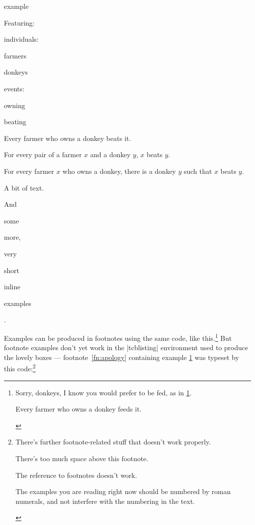 \documentclass[a4paper]{ltxdoc}
\begin{document}
\begin{tcblisting}{example}
  \begin{examples}
  \item Featuring:
    \begin{examples}
    \item individuals:
      \begin{examples*}
      \item farmers
      \item donkeys
      \end{examples*}
    \item events:
      \begin{examples*}
      \item owning
      \item beating
      \end{examples*}
    \end{examples}
  \item Every farmer who owns a donkey beats it.
    \begin{examples}
    \item For every pair of a farmer $x$ and a donkey $y$, $x$ beats $y$.
    \item For every farmer $x$ who owns a donkey, there is a donkey $y$ such
      that $x$ beats $y$.
    \end{examples}
  \end{examples}
  A bit of text.
  \begin{examples*}[itemjoin=\space]
  \item And
  \item some
  \item more,
  \item very
  \item short
  \item inline
  \item examples
  \end{examples*}.
\end{tcblisting}

\newpage

Examples can be produced in footnotes using the same code, like
this.\footnote{Sorry, donkeys, I know you would prefer to be fed, as in
  \ref{ex:donkey:feed}.
  \begin{examples}
  \item\label{ex:donkey:feed} Every farmer who owns a donkey feeds it.
  \end{examples}
} But footnote examples don't yet work in the |tcblisting| environment used to
produce the lovely boxes --- footnote~\ref{fn:apology} containing example
\ref{ex:donkey:feed} was typeset by this code:\footnote{There's further
  footnote-related stuff that doesn't work properly.
  \begin{examples*}
  \item There's too much space above this footnote.
  \item The reference to footnotes doesn't work.
  \item The examples you are reading right now should be numbered by roman
    numerals, and not interfere with the numbering in the text.
  \end{examples*}
}
\end{document}
